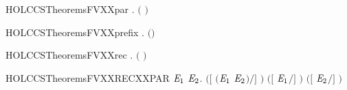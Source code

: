 \newcommand{\HOLCCSTheoremsFVXXnil}{\UseVerbatim{HOLCCSTheoremsFVXXnil}}
\begin{SaveVerbatim}{HOLCCSTheoremsFVXXpar}
\HOLTokenTurnstile{} \HOLSymConst{\HOLTokenForall{}} .  \ensuremath{(} \HOLSymConst{\ensuremath{\mid}} \ensuremath{)} \HOLSymConst{\ensuremath{=}}   \HOLConst{\HOLTokenUnion{}}  
\end{SaveVerbatim}
\newcommand{\HOLCCSTheoremsFVXXpar}{\UseVerbatim{HOLCCSTheoremsFVXXpar}}
\begin{SaveVerbatim}{HOLCCSTheoremsFVXXprefix}
\HOLTokenTurnstile{} \HOLSymConst{\HOLTokenForall{}} .  \ensuremath{(}\HOLSymConst{\ensuremath{\ldotp}}\ensuremath{)} \HOLSymConst{\ensuremath{=}}  
\end{SaveVerbatim}
\newcommand{\HOLCCSTheoremsFVXXprefix}{\UseVerbatim{HOLCCSTheoremsFVXXprefix}}
\begin{SaveVerbatim}{HOLCCSTheoremsFVXXrec}
\HOLTokenTurnstile{} \HOLSymConst{\HOLTokenForall{}} .  \ensuremath{(}  \ensuremath{)} \HOLSymConst{\ensuremath{=}}    
\end{SaveVerbatim}
\newcommand{\HOLCCSTheoremsFVXXrec}{\UseVerbatim{HOLCCSTheoremsFVXXrec}}
\begin{SaveVerbatim}{HOLCCSTheoremsFVXXRECXXPAR}
\HOLTokenTurnstile{} \HOLSymConst{\HOLTokenForall{}}  \ensuremath{\HOLBoundVar{E}\sb{\mathrm{1}}} \ensuremath{\HOLBoundVar{E}\sb{\mathrm{2}}}.
      \ensuremath{(}\ensuremath{[}  \ensuremath{(}\ensuremath{\HOLBoundVar{E}\sb{\mathrm{1}}} \HOLSymConst{\ensuremath{\mid}} \ensuremath{\HOLBoundVar{E}\sb{\mathrm{2}}}\ensuremath{)}\ensuremath{/}\ensuremath{]} \ensuremath{)} \HOLSymConst{\ensuremath{=}}
      \ensuremath{(}\ensuremath{[}  \ensuremath{\HOLBoundVar{E}\sb{\mathrm{1}}}\ensuremath{/}\ensuremath{]} \ensuremath{)} \HOLConst{\HOLTokenUnion{}}  \ensuremath{(}\ensuremath{[}  \ensuremath{\HOLBoundVar{E}\sb{\mathrm{2}}}\ensuremath{/}\ensuremath{]} \ensuremath{)}
\end{SaveVerbatim}
